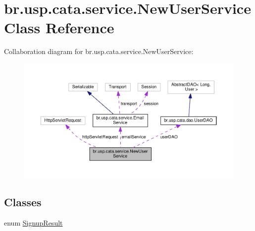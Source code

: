 \hypertarget{classbr_1_1usp_1_1cata_1_1service_1_1_new_user_service}{\section{br.\+usp.\+cata.\+service.\+New\+User\+Service Class Reference}
\label{classbr_1_1usp_1_1cata_1_1service_1_1_new_user_service}
}


Collaboration diagram for br.\+usp.\+cata.\+service.\+New\+User\+Service\+:\nopagebreak
\begin{figure}[H]
\begin{center}
\leavevmode
\includegraphics[width=350pt]{classbr_1_1usp_1_1cata_1_1service_1_1_new_user_service__coll__graph}
\end{center}
\end{figure}
\subsection*{Classes}
\begin{DoxyCompactItemize}
\item 
enum \hyperlink{enumbr_1_1usp_1_1cata_1_1service_1_1_new_user_service_1_1_signup_result}{Signup\+Result}
\end{DoxyCompactItemize}
